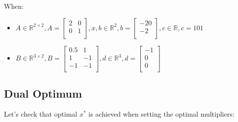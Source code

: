\documentclass[12pt]{article}
\begin{document}
When:\\
\begin{itemize}
  \item $A \in \mathbb{R}^{2 \times 2}, A = \begin{bmatrix}
               2 & 0 \\
               0 & 1 \\
  \end{bmatrix}, x,b \in \mathbb{R}^{2}, b = \begin{bmatrix}   -20 \\ -2\\ \end{bmatrix}, c \in \mathbb{R}, c= 101$ 
  \item $B \in \mathbb{R}^{3 \times 2}, B = \begin{bmatrix}
               0.5 & 1 \\
               1 & -1 \\
               -1 & -1 \\
  \end{bmatrix}, d \in \mathbb{R}^{3}, d = \begin{bmatrix}   -1 \\ 0\\ 0\\\end{bmatrix}$
\end{itemize}

\subsection{Dual Optimum}

Let's check that optimal $x^*$ is achieved when setting the optimal multipliers:
\end{document}
